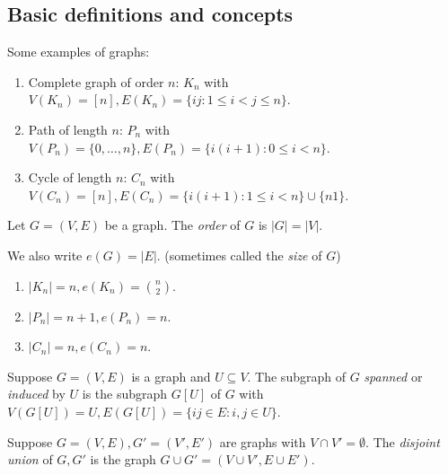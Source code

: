 \documentclass[a4paper]{article}
\begin{document}
\subsection{Basic definitions and concepts}

\begin{eg}
  Some examples of graphs:
  \begin{enumerate}
  \item Complete graph of order \(n\): \(K_n\) with \(V(K_n) = [n], E(K_n) = \{ij: 1 \leq i < j \leq n\}\).
  \item Path of length \(n\): \(P_n\) with \(V(P_n) = \{0, \dots, n\}, E(P_n) = \{i(i + 1): 0 \leq i < n\}\).
  \item Cycle of length \(n\): \(C_n\) with \(V(C_n) = [n], E(C_n) = \{i(i + 1): 1 \leq i < n\} \cup \{n1\}\).
  \end{enumerate}
\end{eg}

\begin{definition}[order]
  Let \(G = (V, E)\) be a graph. The \emph{order} of \(G\) is \(|G| = |V|\).

  We also write \(e(G) = |E|\). (sometimes called the \emph{size} of \(G\))
\end{definition}

\begin{eg}\leavevmode
  \begin{enumerate}
  \item \(|K_n| = n, e(K_n) = \binom{n}{2}\).
  \item \(|P_n| = n + 1, e(P_n) = n\).
  \item \(|C_n| = n, e(C_n) = n\).
  \end{enumerate}
\end{eg}

\begin{definition}
  Suppose \(G = (V, E)\) is a graph and \(U \subseteq V\). The subgraph of \(G\) \emph{spanned} or \emph{induced} by \(U\) is the subgraph \(G[U]\) of \(G\) with \(V(G[U]) = U, E(G[U]) = \{ij \in E: i, j \in U\}\).
\end{definition}

\begin{definition}
  Suppose \(G = (V, E), G' = (V', E')\) are graphs with \(V \cap V' = \emptyset\). The \emph{disjoint union} of \(G, G'\) is the graph \(G \cup G' = (V \cup V', E \cup E')\).
\end{definition}
\end{document}
